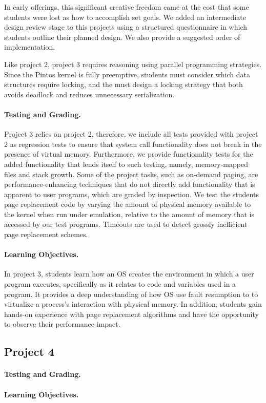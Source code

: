 In early offerings, this significant creative freedom came at the cost that 
some students were lost as how to accomplish set goals.  We added an intermediate
design review stage to this projects using a structured questionnaire in which students 
outline their planned design.  We also provide a suggested order of implementation.

Like project 2, project 3 requires reasoning using parallel programming strategies.  
Since the Pintos kernel is fully preemptive, students must consider which data structures
require locking, and the must design a locking strategy that both avoids deadlock
and reduces unnecessary serialization.

\paragraph{Testing and Grading.}
Project 3 relies on project 2, therefore, we include all tests provided with project 2
as regression tests to ensure that system call functionality does not break in the
presence of virtual memory.  Furthermore, we provide functionality tests for the
added functionality that lends itself to such testing, namely, memory-mapped files
and stack growth.  Some of the project tasks, such as on-demand paging, are 
performance-enhancing techniques that do not directly add functionality that is
apparent to user programs, which are graded by inspection.  We test the students
page replacement code by varying the amount of physical memory available to
the kernel when run under emulation, relative to the amount of memory that is 
accessed by our test programs.  Timeouts are used to detect grossly inefficient 
page replacement schemes.

\paragraph{Learning Objectives.}
In project 3, students learn how an OS creates the environment in which a user
program executes, specifically as it relates to code and variables used in a program.
It provides a deep understanding of how OS use fault resumption to
to virtualize a process's interaction with physical memory.
In addition, students gain hands-on experience with page replacement algorithms
and have the opportunity to observe their performance impact.

%
%
%
\subsection{Project 4}
\paragraph{Testing and Grading.}
\paragraph{Learning Objectives.}


